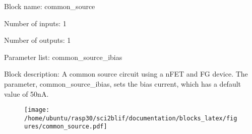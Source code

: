 \pagebreak

Block name: common\_source

Number of inputs: 1

Number of outputs: 1

Parameter list: common\_source\_ibias

Block description: 
A common source circuit using a nFET and FG device. The parameter, common\_source\_ibias, sets the bias current, which has a default value of 50nA.

\begin{figure}[H]  %
\texttt{[image: /home/ubuntu/rasp30/sci2blif/documentation/blocks\_latex/figures/common\_source.pdf]}
\end{figure}

